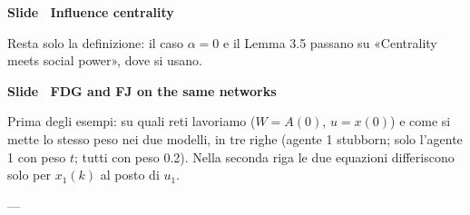 \par\addvspace{14pt}\noindent\begin{minipage}{\textwidth}
{\color{unipd}\bfseries Slide  \textperiodcentered\ Influence centrality}\par\smallskip
{\small Resta solo la definizione: il caso $\alpha = 0$ e il Lemma 3.5 passano su «Centrality meets social power», dove si usano.}\par\smallskip
\noindent\begin{minipage}[t]{0.36\textwidth}\par
{}\par\smallskip
\end{minipage}\hfill\begin{minipage}[t]{0.61\textwidth}\par
{}\par\smallskip
\end{minipage}\par
\end{minipage}\par
\par\addvspace{14pt}\noindent\begin{minipage}{\textwidth}
{\color{unipd}\bfseries Slide  \textperiodcentered\ FDG and FJ on the same networks}\nuova\par\smallskip
{\small Prima degli esempi: su quali reti lavoriamo ($W = A(0)$, $u = x(0)$) e come si mette lo stesso peso nei due modelli, in tre righe (agente 1 stubborn; solo l'agente 1 con peso $t$; tutti con peso 0.2). Nella seconda riga le due equazioni differiscono solo per $x_1(k)$ al posto di $u_1$.}\par\smallskip
\noindent\begin{minipage}[t]{0.36\textwidth}\par
{\small ---}
\end{minipage}\hfill\begin{minipage}[t]{0.61\textwidth}\par
{}\par\smallskip
\end{minipage}\par
\end{minipage}\par
